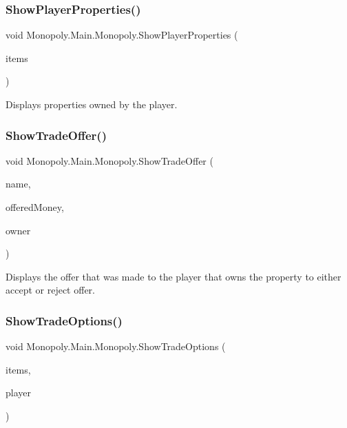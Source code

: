 \subsubsection{\texorpdfstring{Show\+Player\+Properties()}{ShowPlayerProperties()}}
{\footnotesize\ttfamily void Monopoly.\+Main.\+Monopoly.\+Show\+Player\+Properties (\begin{DoxyParamCaption}\item[{List$<$ List\+View\+Item $>$}]{items }\end{DoxyParamCaption})\hspace{0.3cm}{\ttfamily [inline]}}

Displays properties owned by the player. \mbox{\label{class_monopoly_1_1_main_1_1_monopoly_ab13644f37e45aae5108e93a91161dad8}} 
\subsubsection{\texorpdfstring{Show\+Trade\+Offer()}{ShowTradeOffer()}}
{\footnotesize\ttfamily void Monopoly.\+Main.\+Monopoly.\+Show\+Trade\+Offer (\begin{DoxyParamCaption}\item[{string}]{name,  }\item[{float}]{offered\+Money,  }\item[{\mbox{\hyperlink{class_monopoly_1_1_players_1_1_player}{Player}}}]{owner }\end{DoxyParamCaption})\hspace{0.3cm}{\ttfamily [inline]}}

Displays the offer that was made to the player that owns the property to either accept or reject offer. \mbox{\label{class_monopoly_1_1_main_1_1_monopoly_a67590bc6e27eed13ba1469ee4b7774b6}} 
\subsubsection{\texorpdfstring{Show\+Trade\+Options()}{ShowTradeOptions()}}
{\footnotesize\ttfamily void Monopoly.\+Main.\+Monopoly.\+Show\+Trade\+Options (\begin{DoxyParamCaption}\item[{List$<$ List\+View\+Item $>$}]{items,  }\item[{\mbox{\hyperlink{class_monopoly_1_1_players_1_1_player}{Player}}}]{player }\end{DoxyParamCaption})\hspace{0.3cm}{\ttfamily [inline]}}

